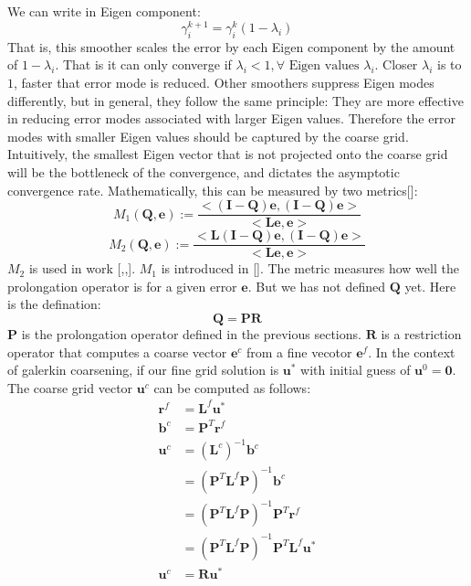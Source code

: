  We can write in Eigen component:
  \begin{equation}
  \gamma^{k+1}_i = \gamma^k_i(1-\lambda_i)
  \end{equation}
  That is, this smoother scales the error by each Eigen component by the amount of $1-\lambda_i$. That is it can only converge if $\lambda_i < 1, \forall \text{ Eigen values } \lambda_i$. Closer $\lambda_i$ is to $1$, faster that error mode is reduced. Other smoothers suppress Eigen modes differently, but in general, they follow the same principle: They are more effective in reducing error modes associated with larger Eigen values. Therefore the error modes with smaller Eigen values should be captured by the coarse grid. Intuitively, the smallest Eigen vector that is not projected onto the coarse grid will be the bottleneck of the convergence, and dictates the asymptotic convergence rate. Mathematically, this can be measured by two metrics[\cite{brezina2001algebraic}]: 
\begin{equation}
\label{equ:M1}
M_1(\mathbf{Q},\mathbf{e}) := \frac{<(\mathbf{I}-\mathbf{Q})\mathbf{e}, (\mathbf{I}-\mathbf{Q})\mathbf{e}>}{<\mathbf{L}\mathbf{e},\mathbf{e}>}
\end{equation}
\begin{equation}
\label{equ:M2}
M_2(\mathbf{Q},\mathbf{e}) := \frac{<\mathbf{L}(\mathbf{I}-\mathbf{Q})\mathbf{e}, (\mathbf{I}-\mathbf{Q})\mathbf{e}>}{<\mathbf{L}\mathbf{e},\mathbf{e}>}
\end{equation}
$M_2$ is used in work [\cite{mccormick1984multigrid},\cite{mccormick1982multigrid},\cite{mccormick1985multigrid}]. $M_1$ is introduced in [\cite{brandt1986algebraic}]. The metric measures how well the prolongation operator is for a given error $\mathbf{e}$. But we has not defined $\mathbf{Q}$ yet. Here is the defination: 
\begin{equation}
\mathbf{Q} = \mathbf{P}\mathbf{R}
\end{equation}
$\mathbf{P}$ is the prolongation operator defined in the previous sections. $\mathbf{R}$ is a restriction operator that computes a coarse vector $\mathbf{e}^c$ from a fine vecotor $\mathbf{e}^f$. In the context of galerkin coarsening, if our fine grid solution is $\mathbf{u}^*$ with initial guess of $\mathbf{u}^0 = \mathbf{0}$. The coarse grid vector $\mathbf{u}^c$ can be computed as follows:
\begin{align*}
\mathbf{r}^f &= \mathbf{L}^f\mathbf{u}^* \\
\mathbf{b}^c &= \mathbf{P}^T\mathbf{r}^f \\
\mathbf{u}^c &= (\mathbf{L}^c)^{-1}\mathbf{b}^c \\
&=  (\mathbf{P}^T\mathbf{L}^f\mathbf{P})^{-1}\mathbf{b}^c \\
&=  (\mathbf{P}^T\mathbf{L}^f\mathbf{P})^{-1}\mathbf{P}^T\mathbf{r}^f \\
&= (\mathbf{P}^T\mathbf{L}^f\mathbf{P})^{-1}\mathbf{P}^T\mathbf{L}^f\mathbf{u}^* \\
\mathbf{u}^c &= \mathbf{R} \mathbf{u}^*
\end{align*}
